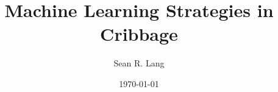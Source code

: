 \documentclass[english]{tktltiki}
\begin{document}

\title{Machine Learning Strategies in Cribbage}
\author{Sean R. Lang}
\date{\today}

\maketitle

\classification{\protect{\ \\
	}
}


\begin{abstract}

\end{abstract}















\nocite{*}






\end{document}
